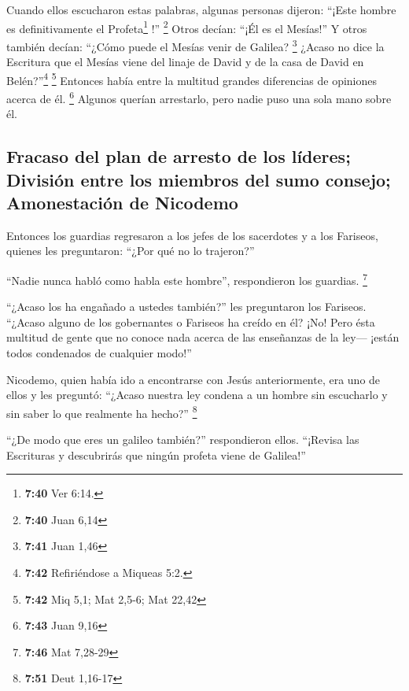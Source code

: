  Cuando ellos escucharon estas palabras, algunas personas
dijeron: ``¡Este hombre es definitivamente el Profeta\footnote{\textbf{7:40}
  Ver 6:14.} !'' \footnote{\textbf{7:40} Juan 6,14} 
Otros decían: ``¡Él es el Mesías!'' Y otros también decían: ``¿Cómo
puede el Mesías venir de Galilea? \footnote{\textbf{7:41} Juan 1,46}
 ¿Acaso no dice la Escritura que el Mesías viene del
linaje de David y de la casa de David en Belén?''\footnote{\textbf{7:42}
  Refiriéndose a Miqueas 5:2.} \footnote{\textbf{7:42} Miq 5,1; Mat
  2,5-6; Mat 22,42}  Entonces había entre la multitud
grandes diferencias de opiniones acerca de él. \footnote{\textbf{7:43}
  Juan 9,16}  Algunos querían arrestarlo, pero nadie puso
una sola mano sobre él.

\hypertarget{fracaso-del-plan-de-arresto-de-los-luxedderes-divisiuxf3n-entre-los-miembros-del-sumo-consejo-amonestaciuxf3n-de-nicodemo}{%
\subsection{Fracaso del plan de arresto de los líderes; División entre
los miembros del sumo consejo; Amonestación de
Nicodemo}\label{fracaso-del-plan-de-arresto-de-los-luxedderes-divisiuxf3n-entre-los-miembros-del-sumo-consejo-amonestaciuxf3n-de-nicodemo}}

 Entonces los guardias regresaron a los jefes de los
sacerdotes y a los Fariseos, quienes les preguntaron: ``¿Por qué no lo
trajeron?''

 ``Nadie nunca habló como habla este hombre'',
respondieron los guardias. \footnote{\textbf{7:46} Mat 7,28-29}

 ``¿Acaso los ha engañado a ustedes también?'' les
preguntaron los Fariseos.  ``¿Acaso alguno de los
gobernantes o Fariseos ha creído en él? ¡No!  Pero ésta
multitud de gente que no conoce nada acerca de las enseñanzas de la
ley--- ¡están todos condenados de cualquier modo!''

 Nicodemo, quien había ido a encontrarse con Jesús
anteriormente, era uno de ellos y les preguntó:  ``¿Acaso
nuestra ley condena a un hombre sin escucharlo y sin saber lo que
realmente ha hecho?'' \footnote{\textbf{7:51} Deut 1,16-17}

 ``¿De modo que eres un galileo también?'' respondieron
ellos. ``¡Revisa las Escrituras y descubrirás que ningún profeta viene
de Galilea!''

